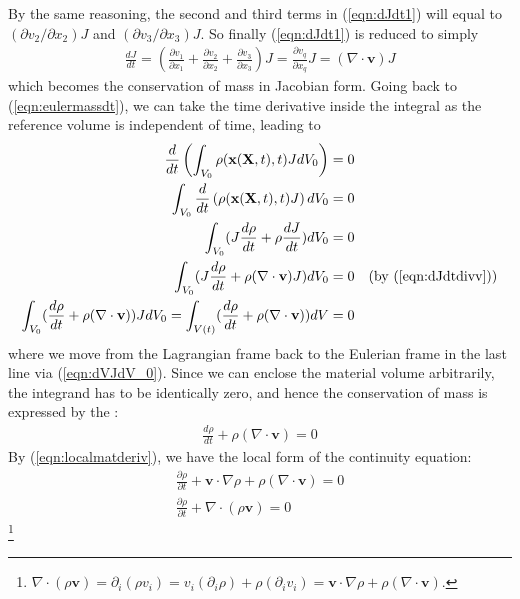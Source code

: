 By the same reasoning, the second and third terms in (\ref{eqn:dJdt1}) will equal to
$(\partial v_2/\partial x_2)J$ and $(\partial v_3/\partial x_3)J$. So finally (\ref{eqn:dJdt1}) is reduced to simply
\begin{align}
\frac{dJ}{dt} = (\frac{\partial v_1}{\partial x_1} + \frac{\partial v_2}{\partial x_2} + \frac{\partial v_3}{\partial x_3}) J = \frac{\partial v_q}{\partial x_q} J = (\nabla \cdot \textbf{v}) J \label{eqn:dJdtdivv}
\end{align}
which becomes the conservation of mass in Jacobian form. Going back to (\ref{eqn:eulermassdt}), we can take the time derivative inside the integral as the reference volume is independent of time, leading to
\begin{align}
\frac{d}{dt}\left(\int_{V_0} \rho(\textbf{x}(\textbf{X},t),t) JdV_0 \right) &= 0 \nonumber \\
\int_{V_0} \frac{d}{dt}\left(\rho(\textbf{x}(\textbf{X},t),t)J\right) dV_0  &= 0 \nonumber \\
\int_{V_0} (J \frac{d\rho}{dt} + \rho\frac{dJ}{dt}) dV_0 &= 0 \nonumber \\
\int_{V_0} (J \frac{d\rho}{dt} + \rho(\nabla \cdot \textbf{v})J) dV_0 &= 0 &\text{(by (\ref{eqn:dJdtdivv}))} \nonumber \\
\int_{V_0} (\frac{d\rho}{dt} + \rho(\nabla \cdot \textbf{v})) JdV_0 = \int_{V(t)}(\frac{d\rho}{dt} + \rho(\nabla \cdot \textbf{v}))dV &= 0
\end{align}
where we move from the Lagrangian frame back to the Eulerian frame in the last line via (\ref{eqn:dVJdV_0}). Since we can enclose the material volume arbitrarily, the integrand has to be identically zero, and hence the conservation of mass is expressed by the :
\begin{align}
\frac{d\rho}{dt} + \rho(\nabla \cdot \textbf{v}) = 0  \label{eqn:contineqn}
\end{align}
By (\ref{eqn:localmatderiv}), we have the local form of the continuity equation:
\begin{align}
\frac{\partial \rho}{\partial t} + \textbf{v} \cdot \nabla\rho + \rho(\nabla \cdot \textbf{v}) = 0  \nonumber \\
\frac{\partial \rho}{\partial t} + \nabla \cdot(\rho\textbf{v}) = 0 
\end{align}
\footnote{\label{footnote:divsv}$\nabla \cdot(\rho\textbf{v}) = \partial_i(\rho v_i) = v_i(\partial_i\rho) + \rho(\partial_iv_i) =  \textbf{v} \cdot \nabla\rho + \rho(\nabla \cdot \textbf{v})$.}

